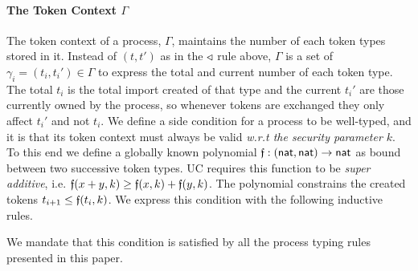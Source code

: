 \paragraph{The Token Context $\Gamma$}
The token context of a process, $\Gamma$, maintains the number of each token types stored in it. 
Instead of $(t,t')$ as in the $\triangleleft$ rule above, $\Gamma$ is a set of $\gamma_i = (t_i, t_i') \in \Gamma$ to express the total and current number of each token type. 
The total $t_i$ is the total import created of that type and the current $t_i'$ are those currently owned by the process, so whenever tokens are exchanged they only affect $t_i'$ and not $t_i$.
We define a side condition for a process to be well-typed, and it is that its token context must always be valid \emph{w.r.t the security parameter $k$}.
To this end we define a globally known polynomial $\mathfrak{f} : ({\mathsf {nat}}, {\mathsf {nat}}) \rightarrow {\mathsf {nat}}$ as bound between two successive token types. UC requires this function to be \emph{super additive}, i.e. $\mathfrak{f}(x+y,k) \geq \mathfrak{f}(x,k) + \mathfrak{f}(y,k)$.
The polynomial constrains the created tokens $t_{i+1} \leq \mathfrak{f}(t_i, k)$.
We express this condition with the following inductive rules.
We mandate that this condition is satisfied by all the process typing rules presented in this paper.

